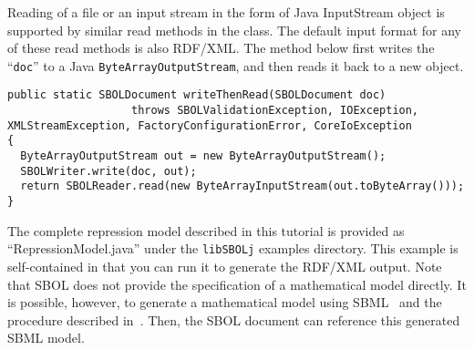 Reading of a file or an input stream in the form of Java InputStream
object is supported by similar read methods in the 
class. The default input format for any of these read methods is also
RDF/XML. The method below first writes the 
``\lstinline+doc+'' to a Java \lstinline+ByteArrayOutputStream+,
and then reads it back to a new  object.

\begin{minipage}{0.95\textwidth} 
\begin{lstlisting}
public static SBOLDocument writeThenRead(SBOLDocument doc)
	               throws SBOLValidationException, IOException, XMLStreamException, FactoryConfigurationError, CoreIoException
{
  ByteArrayOutputStream out = new ByteArrayOutputStream();
  SBOLWriter.write(doc, out);
  return SBOLReader.read(new ByteArrayInputStream(out.toByteArray()));
}
\end{lstlisting}
\end{minipage}

The complete repression model described in this tutorial is provided as ``RepressionModel.java'' under the {\tt libSBOLj} examples directory. This example is self-contained in that you can run it to generate the RDF/XML output. Note that SBOL does not provide the specification of a mathematical model directly. It is possible, however, to generate a mathematical model using SBML~\cite{SBML} and the procedure described in~\cite{roehner2015generating}. Then, the SBOL document can reference this generated SBML model.

